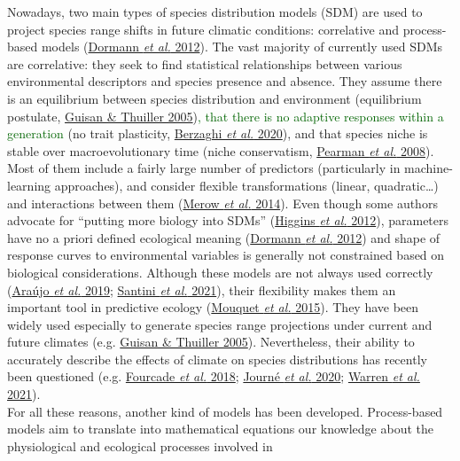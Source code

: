 \documentclass[11pt,]{article}
\begin{document}
Nowadays, two main types of species distribution models (SDM) are used
to project species range shifts in future climatic conditions:
correlative and process-based models
(\protect\hyperlink{ref-Dormann2012}{Dormann \emph{et al.} 2012}). The
vast majority of currently used SDMs are correlative: they seek to find
statistical relationships between various environmental descriptors and
species presence and absence. They assume there is an equilibrium
between species distribution and environment (equilibrium postulate,
\protect\hyperlink{ref-Guisan2005}{Guisan \& Thuiller
2005})\textcolor{darkgreen}{, that there is no adaptive responses within a generation}
(no trait plasticity, \protect\hyperlink{ref-Berzaghi2020}{Berzaghi
\emph{et al.} 2020}), and that species niche is stable over
macroevolutionary time (niche conservatism,
\protect\hyperlink{ref-Pearman2008}{Pearman \emph{et al.} 2008}). Most
of them include a fairly large number of predictors (particularly in
machine-learning approaches), and consider flexible transformations
(linear, quadratic\ldots) and interactions between them
(\protect\hyperlink{ref-Merow2014}{Merow \emph{et al.} 2014}). Even
though some authors advocate for ``putting more biology into SDMs''
(\protect\hyperlink{ref-Higgins2012}{Higgins \emph{et al.} 2012}),
parameters have no a priori defined ecological meaning
(\protect\hyperlink{ref-Dormann2012}{Dormann \emph{et al.} 2012}) and
shape of response curves to environmental variables is generally not
constrained based on biological considerations. Although these models
are not always used correctly (\protect\hyperlink{ref-Araujo2019}{Araújo
\emph{et al.} 2019}; \protect\hyperlink{ref-Santini2021}{Santini
\emph{et al.} 2021}), their flexibility makes them an important tool in
predictive ecology (\protect\hyperlink{ref-Mouquet2015}{Mouquet \emph{et
al.} 2015}). They have been widely used especially to generate species
range projections under current and future climates (e.g.
\protect\hyperlink{ref-Guisan2005}{Guisan \& Thuiller 2005}).
Nevertheless, their ability to accurately describe the effects of
climate on species distributions has recently been questioned (e.g.
\protect\hyperlink{ref-Fourcade2018}{Fourcade \emph{et al.} 2018};
\protect\hyperlink{ref-Journe2020}{Journé \emph{et al.} 2020};
\protect\hyperlink{ref-Warren2021}{Warren \emph{et al.} 2021}).\\
For all these reasons, another kind of models has been developed.
Process-based models aim to translate into mathematical equations our
knowledge about the physiological and ecological processes involved in
\end{document}
